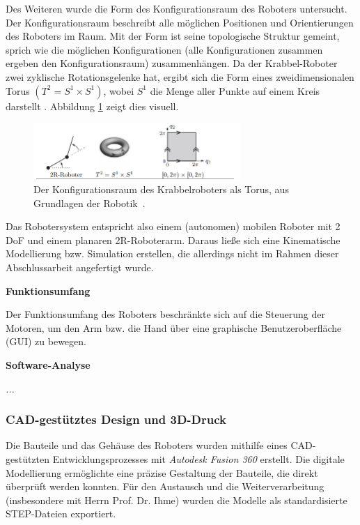 Des Weiteren wurde die Form des Konfigurationsraum des Roboters untersucht. Der Konfigurationsraum beschreibt alle möglichen Positionen und Orientierungen des Roboters im Raum. Mit der Form ist seine topologische Struktur gemeint, sprich wie die möglichen Konfigurationen (alle Konfigurationen zusammen ergeben den Konfigurationsraum) zusammenhängen. Da der Krabbel-Roboter zwei zyklische Rotationsgelenke hat, ergibt sich die Form eines zweidimensionalen Torus $(T^2 = S^1 \times S^1)$, wobei $S^1$ die Menge aller Punkte auf einem Kreis darstellt \cite{robotik_scriptum}. Abbildung \ref{fig:torus} zeigt dies visuell.
\begin{figure}[h]
  \centering
  \includegraphics[width=0.7\textwidth]{torus.png}
  \caption{Der Konfigurationsraum des Krabbelroboters als Torus, aus \glqq Grundlagen der Robotik\grqq \ \cite{robotik_scriptum}.}
  \label{fig:torus}
\end{figure}

Das Robotersystem entspricht also einem (autonomen) mobilen Roboter mit 2 DoF und einem planaren 2R-Roboterarm. Daraus ließe sich eine Kinematische Modellierung bzw. Simulation erstellen, die allerdings nicht im Rahmen dieser Abschlussarbeit angefertigt wurde. 

\textbf{Funktionsumfang}

Der Funktionsumfang des Roboters beschränkte sich auf die Steuerung der Motoren, um den Arm bzw. die Hand über eine graphische Benutzeroberfläche (GUI) zu bewegen.

\textbf{Software-Analyse}

\textit{...}

\subsubsection{CAD-gestütztes Design und 3D-Druck}

Die Bauteile und das Gehäuse des Roboters wurden mithilfe eines CAD-gestützten Entwicklungsprozesses mit \textit{Autodesk Fusion 360} erstellt. Die digitale Modellierung ermöglichte eine präzise Gestaltung der Bauteile, die direkt überprüft werden konnten. Für den Austausch und die Weiterverarbeitung (insbesondere mit Herrn Prof. Dr. Ihme) wurden die Modelle als standardisierte STEP-Dateien exportiert.

